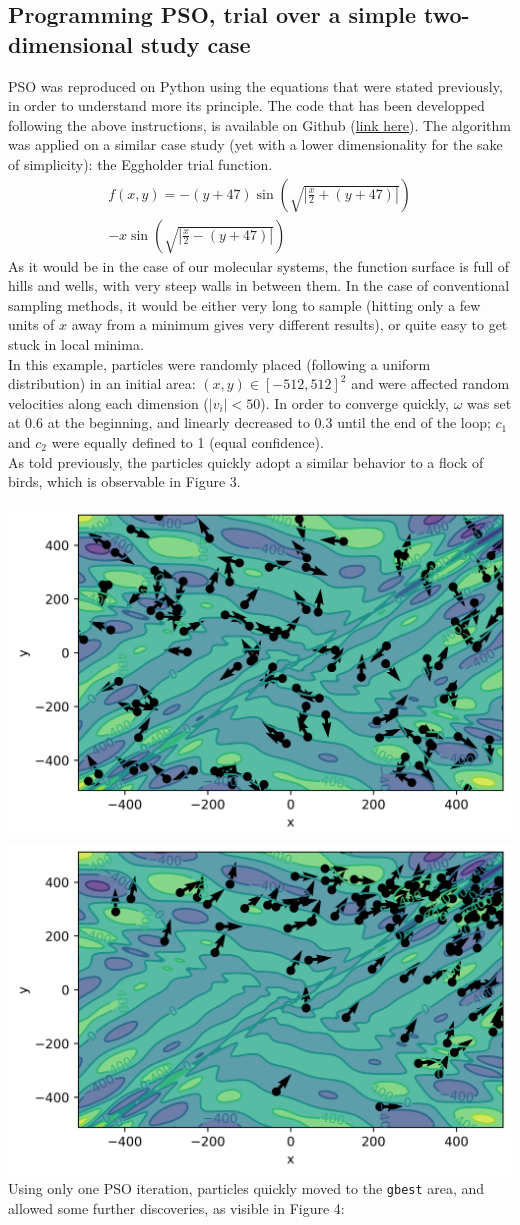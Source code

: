 \documentclass[11pt]{article}
\begin{document}
\begin{multicols}{2}
\subsection*{Programming PSO, trial over a simple two-dimensional study case}
PSO was reproduced on Python using the equations that were stated previously, in order to understand more its principle. The code that has been developped following the above instructions, is available on Github (\href{https://github.com/antoinegslr/ParticleSwarnOptimization}{link here}). The algorithm was applied on a similar case study (yet with a lower dimensionality for the sake of simplicity): the Eggholder trial function.
\begin{multline*}
    f(x,y)=-(y+47)\sin\left(\sqrt{\left|\frac{x}{2}+(y+47)\right|}\right)\\-x\sin\left(\sqrt{\left|\frac{x}{2}-(y+47)\right|}\right)
\end{multline*}
As it would be in the case of our molecular systems, the function surface is full of hills and wells, with very steep walls in between them. In the case of conventional sampling methods, it would be either very long to sample (hitting only a few units of $x$ away from a minimum gives very different results), or quite easy to get stuck in local minima.\\
In this example, particles were randomly placed (following a uniform distribution) in an initial area: $(x,y)\in\left[-512,512\right]^2$ and were affected random velocities along each dimension ($|v_i|<50$). In order to converge quickly, $\omega$ was set at 0.6 at the beginning, and linearly decreased to 0.3 until the end of the loop; $c_1$ and $c_2$ were equally defined to 1 (equal confidence).\\
As told previously, the particles quickly adopt a similar behavior to a flock of birds, which is observable in Figure 3.
\bigskip

\noindent\includegraphics[width=0.5\columnwidth]{figures/ite0.png}\includegraphics[width=0.5\columnwidth]{figures/ite1.png}
\medskip
Using only one PSO iteration, particles quickly moved to the \verb+gbest+ area, and allowed some further discoveries, as visible in Figure 4:
\bigskip


\end{multicols}
\end{document}
